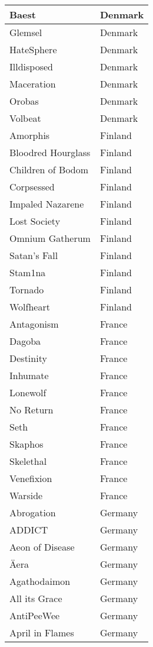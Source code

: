\documentclass[12pt, a4paper, twoside]{report}
\begin{document}
\begin{center}
\begin{longtable}{|p{5cm}|p{5cm}|}
Baest & Denmark \\ \hline
Glemsel & Denmark \\ \hline
HateSphere & Denmark \\ \hline
Illdisposed & Denmark \\ \hline
Maceration & Denmark \\ \hline
Orobas & Denmark \\ \hline
Volbeat & Denmark \\ \hline
Amorphis & Finland \\ \hline
Bloodred Hourglass & Finland \\ \hline
Children of Bodom & Finland \\ \hline
Corpsessed & Finland \\ \hline
Impaled Nazarene & Finland \\ \hline
Lost Society & Finland \\ \hline
Omnium Gatherum & Finland \\ \hline
Satan's Fall & Finland \\ \hline
Stam1na & Finland \\ \hline
Tornado & Finland \\ \hline
Wolfheart & Finland \\ \hline
Antagonism & France \\ \hline
Dagoba & France \\ \hline
Destinity & France \\ \hline
Inhumate & France \\ \hline
Lonewolf & France \\ \hline
No Return & France \\ \hline
Seth & France \\ \hline
Skaphos & France \\ \hline
Skelethal & France \\ \hline
Venefixion & France \\ \hline
Warside & France \\ \hline
Abrogation & Germany \\ \hline
ADDICT & Germany \\ \hline
Aeon of Disease & Germany \\ \hline
Äera & Germany \\ \hline
Agathodaimon & Germany \\ \hline
All its Grace & Germany \\ \hline
AntiPeeWee & Germany \\ \hline
April in Flames & Germany \\ \hline

\end{longtable}
\end{center}
\end{document}
